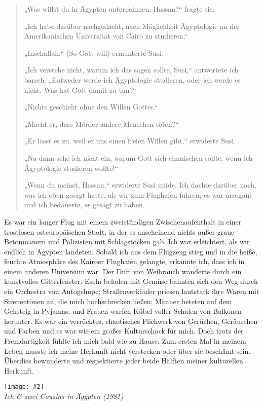\documentclass[12pt]{memoir}
\newcommand{\img}[3]{\begin{center}%
\texttt{[image: \#2]}\\{\small\em#3}%
\end{center}}
\begin{document}
\begin{quote}
„Was willst du in Ägypten unternehmen, Hassan?“ fragte sie.

„Ich habe darüber nachgedacht, nach Möglichkeit Ägyptologie
an der Amerikanischen Universität von Cairo zu studieren.“

„Inschallah,“ (So Gott will) ermunterte Susi.

„Ich verstehe nicht, warum ich das sagen sollte, Susi,“ antwortete ich barsch.
„Entweder werde ich Ägyptologie studieren, oder ich werde es nicht.
Was hat Gott damit zu tun?“

„Nichts geschieht ohne den Willen Gottes.“

„Macht er, dass Mörder andere Menschen töten?“

„Er lässt es zu, weil er uns einen freien Willen gibt,“ erwiderte Susi.

„Na dann sehe ich nicht ein, warum Gott sich einmischen sollte,
wenn ich Ägyptologie studieren wollte!“

„Wenn du meinst, Hassan,“ erwiderte Susi müde.
Ich dachte darüber nach, was ich eben gesagt hatte,
als wir zum Flughafen fuhren;
es war arrogant und ich bedauerte, es gesagt zu haben.
\end{quote}

Es war ein langer Flug mit einem zweistündigen Zwischenaufenthalt
in einer trostlosen osteuropäischen Stadt,
in der es anscheinend nichts außer graue Betonmauern
und Polizisten mit Schlagstöcken gab.
Ich war erleichtert, als wir endlich in Ägypten landeten.
Sobald ich aus dem Flugzeug stieg und in die heiße,
feuchte Atmosphäre des Kairoer Flughafen gelangte, erkannte ich,
dass ich in einem anderen Universum war.
Der Duft von Weihrauch wanderte durch ein kunstvolles Gitterfenster.
Eseln beladen mit Gemüse bahnten sich den Weg
durch ein Orchestra von Autogehupe;
Straßenverkäufer priesen lautstark ihre Waren mit Sirenentönen an,
die mich hochschrecken ließen;
Männer beteten auf dem Gehsteig in Pyjamas;
und Frauen warfen Kübel voller Schalen von Balkonen herunter.
Es war ein verrücktes, chaotisches Flickwerk von Gerüchen,
Geräuschen und Farben und es war wie ein großer Kulturschock für mich.
Doch trotz der Fremdartigkeit fühlte ich mich bald wie zu Hause.
Zum ersten Mal in meinem Leben musste ich meine Herkunft nicht verstecken
oder über sie beschämt sein.
Überdies bewunderte und respektierte jeder beide Hälften
meiner kulturellen Herkunft.

\img{scale=0.3}{Hassan_Cousins.jpg}
{Ich \& zwei Cousins in Ägypten (1981)}
\end{document}
